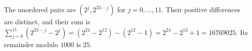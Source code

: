 The unordered pairs are $(2^j,2^{23-j})$ for $j=0,\ldots,11$. Their positive differences are distinct, and their sum is $\sum_{j=0}^{11}(2^{23-j}-2^j)=(2^{24}-2^{12})-(2^{12}-1)=2^{24}-2^{13}+1=16769025$. Its remainder modulo $1000$ is $\boxed{25}$.
